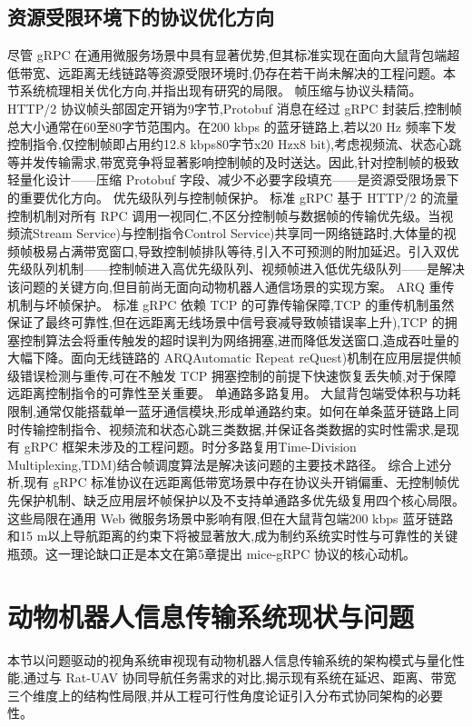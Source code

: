 \subsection{资源受限环境下的协议优化方向}
尽管 gRPC 在通用微服务场景中具有显著优势,但其标准实现在面向大鼠背包端超低带宽、远距离无线链路等资源受限环境时,仍存在若干尚未解决的工程问题。本节系统梳理相关优化方向,并指出现有研究的局限。
帧压缩与协议头精简。 HTTP/2 协议帧头部固定开销为9字节,Protobuf 消息在经过 gRPC 封装后,控制帧总大小通常在60至80字节范围内。在200 kbps 的蓝牙链路上,若以20 Hz 频率下发控制指令,仅控制帧即占用约12.8 kbps80字节x20 Hzx8 bit),考虑视频流、状态心跳等并发传输需求,带宽竞争将显著影响控制帧的及时送达。因此,针对控制帧的极致轻量化设计——压缩 Protobuf 字段、减少不必要字段填充——是资源受限场景下的重要优化方向。
优先级队列与控制帧保护。 标准 gRPC 基于 HTTP/2 的流量控制机制对所有 RPC 调用一视同仁,不区分控制帧与数据帧的传输优先级。当视频流Stream Service)与控制指令Control Service)共享同一网络链路时,大体量的视频帧极易占满带宽窗口,导致控制帧排队等待,引入不可预测的附加延迟。引入双优先级队列机制——控制帧进入高优先级队列、视频帧进入低优先级队列——是解决该问题的关键方向,但目前尚无面向动物机器人通信场景的实现方案。
ARQ 重传机制与坏帧保护。 标准 gRPC 依赖 TCP 的可靠传输保障,TCP 的重传机制虽然保证了最终可靠性,但在远距离无线场景中信号衰减导致帧错误率上升),TCP 的拥塞控制算法会将重传触发的超时误判为网络拥塞,进而降低发送窗口,造成吞吐量的大幅下降。面向无线链路的 ARQAutomatic Repeat reQuest)机制在应用层提供帧级错误检测与重传,可在不触发 TCP 拥塞控制的前提下快速恢复丢失帧,对于保障远距离控制指令的可靠性至关重要。
单通路多路复用。 大鼠背包端受体积与功耗限制,通常仅能搭载单一蓝牙通信模块,形成单通路约束。如何在单条蓝牙链路上同时传输控制指令、视频流和状态心跳三类数据,并保证各类数据的实时性需求,是现有 gRPC 框架未涉及的工程问题。时分多路复用Time-Division Multiplexing,TDM)结合帧调度算法是解决该问题的主要技术路径。
综合上述分析,现有 gRPC 标准协议在远距离低带宽场景中存在协议头开销偏重、无控制帧优先保护机制、缺乏应用层坏帧保护以及不支持单通路多优先级复用四个核心局限。这些局限在通用 Web 微服务场景中影响有限,但在大鼠背包端200 kbps 蓝牙链路和15 m以上导航距离的约束下将被显著放大,成为制约系统实时性与可靠性的关键瓶颈。这一理论缺口正是本文在第5章提出 mice-gRPC 协议的核心动机。


\section{动物机器人信息传输系统现状与问题}
本节以问题驱动的视角系统审视现有动物机器人信息传输系统的架构模式与量化性能,通过与 Rat-UAV 协同导航任务需求的对比,揭示现有系统在延迟、距离、带宽三个维度上的结构性局限,并从工程可行性角度论证引入分布式协同架构的必要性。
